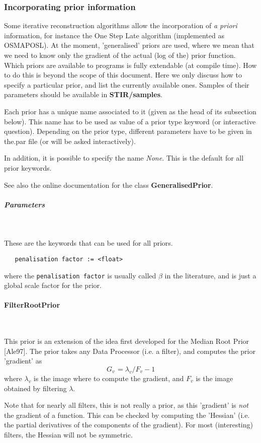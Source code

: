 \documentclass{article}
\newcommand{\subsubsubsection}[1]{\paragraph{#1}\mbox{} \\}
\newcommand{\subsubsubsubsection}[1]{\subparagraph{#1} \mbox{} \\}
\begin{document}
{\subsubsection{
Incorporating prior information}
\label{sec:priors}
Some iterative reconstruction algorithms allow the incorporation 
of \textit{a priori} information, for instance the One Step Late algorithm 
(implemented as OSMAPOSL). At the moment, 'generalised' priors 
are used, where we mean that we need to know only the gradient 
of the actual (log of the) prior function.\\
Which priors are available to programs is fully extendable (at 
compile time). How to do this is beyond the scope of this document. 
Here we only discuss how to specify a particular prior, and list 
the currently available ones. Samples of their parameters should 
be available in \textbf{STIR/samples}.



Each prior has a unique name associated to it (given as the head 
of its subsection below). This name has to be used as value of 
a prior type keyword (or interactive question). Depending on 
the prior type, different parameters have to be given in the.par 
file (or will be asked interactively).


In addition, it is possible to specify the name \textit{None}. This 
is the default for all prior keywords.


See also the online documentation for the class \textbf{GeneralisedPrior}.


{ \subsubsubsubsection{Parameters}
}
These are the keywords that can be used for all priors.
  \begin{verbatim}
   penalisation factor := <float>
  \end{verbatim}
  \noindent where the \texttt{penalisation factor} is usually called
  $\beta$ in the literature, and is just a global scale factor for the
  prior.

{ \subsubsubsection{FilterRootPrior}
}
This prior is an extension of the idea first developed for the 
Median Root Prior [Ale97]. The prior takes any Data Processor 
(i.e. a filter), and computes the prior 'gradient' as 
\[
G_{v\,} =\lambda _{v} /F_{v}  -1
\]
\noindent where 
$\lambda _{v} $
 is the image where to compute the gradient, and 
$F_{v} $ is the image obtained by filtering $\lambda $.

Note that for nearly all filters, this is not really a prior, as 
this 'gradient' is \textit{not} the gradient of a function. This can 
be checked by computing the 'Hessian' (i.e. the partial derivatives 
of the components of the gradient). For most (interesting) filters, 
the Hessian will not be symmetric.


}
\end{document}

